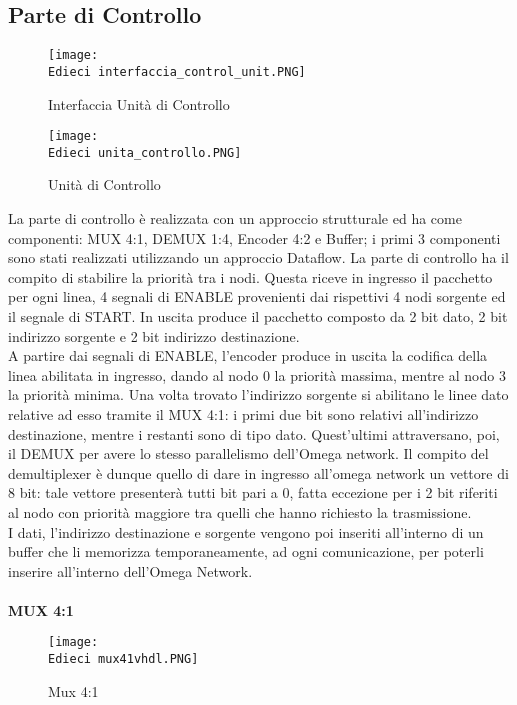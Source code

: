 \documentclass[12pt]{article}
\def \Edieci {Allegati/Esercizio10/}
\begin{document}
\subsection{Parte di Controllo}
\begin{figure}[ht!]
    \centering
    \texttt{[image: \\Edieci interfaccia\_control\_unit.PNG]}
    \caption{Interfaccia Unità di Controllo}
\end{figure}
\begin{figure}[ht!]
    \centering
    \texttt{[image: \\Edieci unita\_controllo.PNG]}
    \caption{Unità di Controllo}
\end{figure}
La parte di controllo è realizzata con un approccio strutturale ed ha come componenti: MUX 4:1, DEMUX 1:4, Encoder 4:2 e Buffer; i primi 3 componenti sono stati realizzati utilizzando un approccio Dataflow. La parte di controllo ha il compito di stabilire la priorità tra i nodi. Questa riceve in ingresso il pacchetto per ogni linea, 4 segnali di ENABLE provenienti dai rispettivi 4 nodi sorgente ed il segnale di START. In uscita produce il pacchetto composto da 2 bit dato, 2 bit indirizzo sorgente e 2 bit indirizzo destinazione.
\\A partire dai segnali di ENABLE, l’encoder produce in uscita la codifica della linea abilitata in ingresso, dando al nodo 0 la priorità massima, mentre al nodo 3 la priorità minima. Una volta trovato l’indirizzo sorgente si abilitano le linee dato relative ad esso tramite il MUX 4:1: i primi due bit sono relativi all’indirizzo destinazione, mentre i restanti sono di tipo dato. Quest’ultimi attraversano, poi, il DEMUX per avere lo stesso parallelismo dell’Omega network. Il compito del demultiplexer è dunque quello di dare in ingresso all’omega network un vettore di 8 bit: tale vettore presenterà tutti bit pari a 0, fatta eccezione per i 2 bit riferiti al nodo con priorità maggiore tra quelli che hanno richiesto la trasmissione.
\\I dati, l’indirizzo destinazione e sorgente vengono poi inseriti all’interno di un buffer che li memorizza temporaneamente, ad ogni comunicazione, per poterli inserire all’interno dell’Omega Network.
\\\\{\large \textbf{MUX 4:1}}
\begin{figure}[ht!]
    \centering
    \texttt{[image: \\Edieci mux41vhdl.PNG]}
    \caption{Mux 4:1}
\end{figure}
\end{document}
